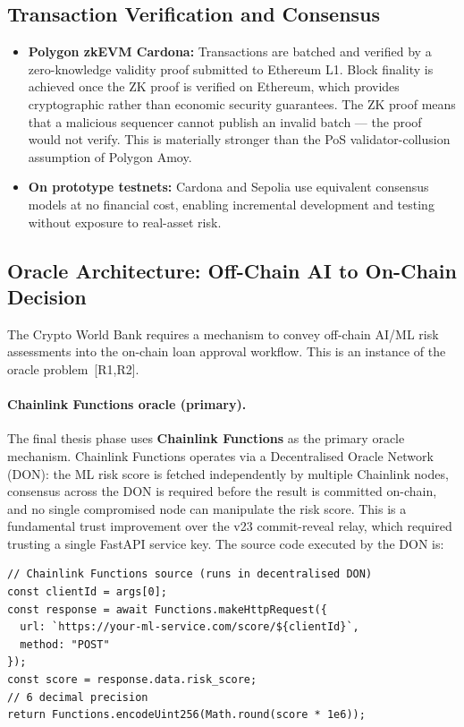 \documentclass[12pt,a4paper]{report}
\begin{document}
\subsection{Transaction Verification and Consensus}

\begin{itemize}[noitemsep]
\item \textbf{Polygon zkEVM Cardona:} Transactions are batched and verified by a zero-knowledge validity proof submitted to Ethereum L1. Block finality is achieved once the ZK proof is verified on Ethereum, which provides cryptographic rather than economic security guarantees. The ZK proof means that a malicious sequencer cannot publish an invalid batch --- the proof would not verify. This is materially stronger than the PoS validator-collusion assumption of Polygon Amoy.
\item \textbf{On prototype testnets:} Cardona and Sepolia use equivalent consensus models at no financial cost, enabling incremental development and testing without exposure to real-asset risk.
\end{itemize}

\subsection{Oracle Architecture: Off-Chain AI to On-Chain Decision}
\label{sec:oracle-architecture}

The Crypto World Bank requires a mechanism to convey off-chain AI/ML risk assessments into the on-chain loan approval workflow. This is an instance of the oracle problem~[R1,R2].

\paragraph{Chainlink Functions oracle (primary).}
The final thesis phase uses \textbf{Chainlink Functions} as the primary oracle mechanism. Chainlink Functions operates via a Decentralised Oracle Network (DON): the ML risk score is fetched independently by multiple Chainlink nodes, consensus across the DON is required before the result is committed on-chain, and no single compromised node can manipulate the risk score. This is a fundamental trust improvement over the v23 commit-reveal relay, which required trusting a single FastAPI service key. The source code executed by the DON is:

\begin{verbatim}
// Chainlink Functions source (runs in decentralised DON)
const clientId = args[0];
const response = await Functions.makeHttpRequest({
  url: `https://your-ml-service.com/score/${clientId}`,
  method: "POST"
});
const score = response.data.risk_score;
// 6 decimal precision
return Functions.encodeUint256(Math.round(score * 1e6));
\end{verbatim}
\end{document}
